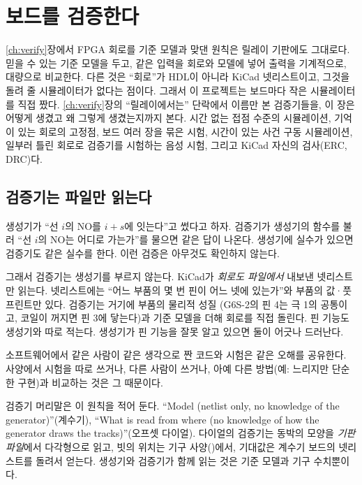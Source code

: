 \chapter{보드를 검증한다}\label{ch:boardverify}

\ref{ch:verify}장에서 FPGA 회로를 기준 모델과 맞댄 원칙은 릴레이 기판에도 그대로다. 믿을 수 있는 기준 모델을
두고, 같은 입력을 회로와 모델에 넣어 출력을 기계적으로, 대량으로 비교한다. 다른 것은 ``회로''가 HDL이 아니라
KiCad 넷리스트이고, 그것을 돌려 줄 시뮬레이터가 없다는 점이다. 그래서 이 프로젝트는 보드마다 작은 시뮬레이터를
직접 짰다. \ref{ch:verify}장의 ``릴레이에서는'' 단락에서 이름만 본 검증기들을, 이 장은 어떻게 생겼고 왜 그렇게 생겼는지까지
본다. 시간 없는 접점 수준의 시뮬레이션, 기억이 있는 회로의 고정점,
보드 여러 장을 묶은 시험, 시간이 있는 사건 구동 시뮬레이션, 일부러 틀린 회로로 검증기를 시험하는 음성
시험, 그리고 KiCad 자신의 검사(ERC, DRC)다.

\section{검증기는 파일만 읽는다}\label{sec:v-indep}

\Why 생성기가 ``선 $i$의 NO를 $i + s$에 잇는다''고 썼다고 하자. 검증기가 생성기의 함수를 불러 ``선 $i$의 NO는
어디로 가는가''를 물으면 같은 답이 나온다. 생성기에 실수가 있으면 검증기도 같은 실수를 한다. 이런 검증은 아무것도
확인하지 않는다.

그래서 검증기는 생성기를 부르지 않는다. KiCad가 \emph{회로도 파일에서} 내보낸 넷리스트만 읽는다. 넷리스트에는
``어느 부품의 몇 번 핀이 어느 넷에 있는가''와 부품의 값·풋프린트만 있다. 검증기는 거기에 부품의 물리적 성질
(G6S-2의 핀 4는 극 1의 공통이고, 코일이 꺼지면 핀 3에 닿는다)과 기준 모델을 더해 회로를 직접 돌린다. 핀 기능도
생성기와 따로 적는다. 생성기가 핀 기능을 잘못 알고 있으면 둘이 어긋나 드러난다.

\General 소프트웨어에서 같은 사람이 같은 생각으로 짠 코드와 시험은 같은 오해를 공유한다. 사양에서 시험을 따로
쓰거나, 다른 사람이 쓰거나, 아예 다른 방법(예: 느리지만 단순한 구현)과 비교하는 것은 그 때문이다.

\Ours 검증기 머리말은 이 원칙을 적어 둔다. ``Model (netlist only, no knowledge of the generator)''(계수기),
``What is read from where (no knowledge of how the generator draws the tracks)''(오프셋 다이얼). 다이얼의 검증기는
동박의 모양을 \emph{기판 파일}에서 다각형으로 읽고, 빗의 위치는 기구 사양()에서, 기대값은
계수기 보드의 넷리스트를 돌려서 얻는다. 생성기와 검증기가 함께 읽는 것은 기준 모델과 기구 수치뿐이다.

